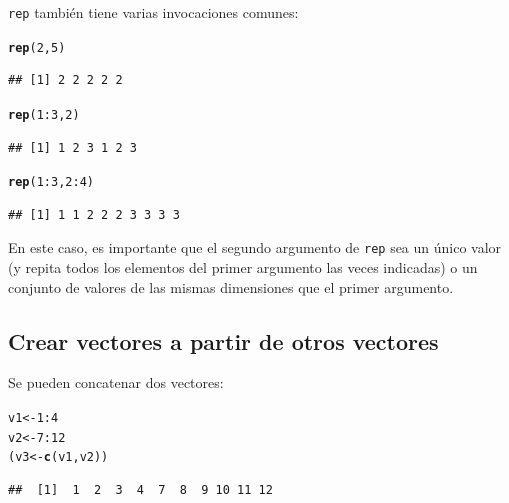 \documentclass{config/apuntes}\usepackage[]{graphicx}\usepackage[]{xcolor}
\makeatletter
\newcommand{\hlnum}[1]{\textcolor[rgb]{0.686,0.059,0.569}{#1}}%
\newcommand{\hlopt}[1]{\textcolor[rgb]{0,0,0}{#1}}%
\newcommand{\hldef}[1]{\textcolor[rgb]{0.345,0.345,0.345}{#1}}%
\newcommand{\hlkwb}[1]{\textcolor[rgb]{0.69,0.353,0.396}{#1}}%
\newcommand{\hlkwd}[1]{\textcolor[rgb]{0.737,0.353,0.396}{\textbf{#1}}}%
\newenvironment{kframe}{%
 \def\at@end@of@kframe{}%
 \ifinner\ifhmode%
  \def\at@end@of@kframe{\end{minipage}}%
  \begin{minipage}{\columnwidth}%
 \fi\fi%
 \def\FrameCommand##1{\hskip\@totalleftmargin \hskip-\fboxsep
 \colorbox{shadecolor}{##1}\hskip-\fboxsep
     \hskip-\linewidth \hskip-\@totalleftmargin \hskip\columnwidth}%
 \MakeFramed {\advance\hsize-\width
   \@totalleftmargin\z@ \linewidth\hsize
   \@setminipage}}%
 {\par\unskip\endMakeFramed%
 \at@end@of@kframe}
\newenvironment{knitrout}{}{} %
\newcommand{\code}[1]{\texttt{#1}}
\makeatother
\begin{document}
\code{rep} también tiene varias invocaciones comunes:
\begin{knitrout}
\color{fgcolor}\begin{kframe}
\begin{alltt}
\hlkwd{rep}\hldef{(}\hlnum{2}\hldef{,} \hlnum{5}\hldef{)}
\end{alltt}
\begin{verbatim}
## [1] 2 2 2 2 2
\end{verbatim}
\begin{alltt}
\hlkwd{rep}\hldef{(}\hlnum{1}\hlopt{:}\hlnum{3}\hldef{,} \hlnum{2}\hldef{)}
\end{alltt}
\begin{verbatim}
## [1] 1 2 3 1 2 3
\end{verbatim}
\begin{alltt}
\hlkwd{rep}\hldef{(}\hlnum{1}\hlopt{:}\hlnum{3}\hldef{,} \hlnum{2}\hlopt{:}\hlnum{4}\hldef{)}
\end{alltt}
\begin{verbatim}
## [1] 1 1 2 2 2 3 3 3 3
\end{verbatim}
\end{kframe}
\end{knitrout}

En este caso, es importante que el segundo argumento de \code{rep} sea un único valor (y repita todos los elementos del primer argumento las veces indicadas) o un conjunto de valores de las mismas dimensiones que el primer argumento. 

\subsection{Crear vectores a partir de otros vectores}
Se pueden concatenar dos vectores:

\begin{knitrout}
\color{fgcolor}\begin{kframe}
\begin{alltt}
\hldef{v1} \hlkwb{<-} \hlnum{1}\hlopt{:}\hlnum{4}
\hldef{v2} \hlkwb{<-} \hlnum{7}\hlopt{:}\hlnum{12}
\hldef{(v3} \hlkwb{<-} \hlkwd{c}\hldef{(v1, v2))}
\end{alltt}
\begin{verbatim}
##  [1]  1  2  3  4  7  8  9 10 11 12
\end{verbatim}
\end{kframe}
\end{knitrout}
\end{document}
